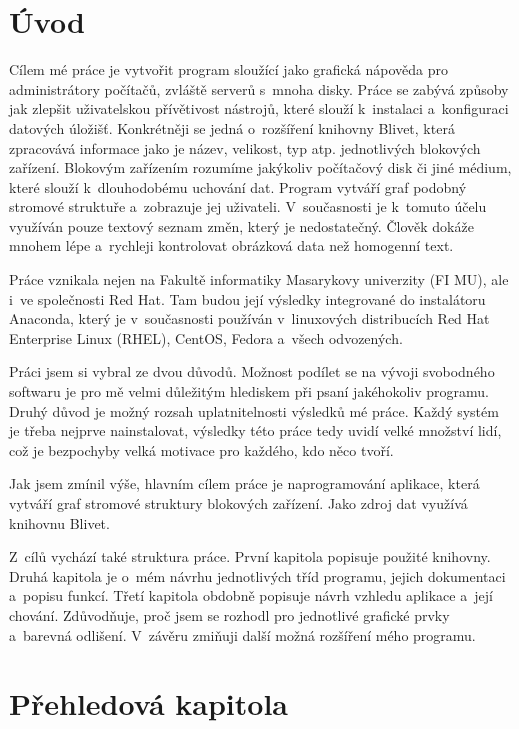 \documentclass[printed,color,table,oneside,nolot,nolof]{fithesis}
\begin{document}
\chapter{Úvod}
	Cílem mé  práce je vytvořit program sloužící jako grafická nápověda pro administrátory počítačů, zvláště serverů s~mnoha disky. Práce se zabývá 
	způsoby jak zlepšit uživatelskou přívětivost nástrojů, které slouží k~instalaci a~konfiguraci datových úložišť.
	Konkrétněji se jedná o~rozšíření knihovny Blivet\cite{blivet}, která zpracovává informace jako je název, velikost, typ atp.
	jednotlivých blokových zařízení. Blokovým zařízením rozumíme jakýkoliv počítačový disk či jiné médium, které slouží k~dlouhodobému uchování dat.
	Program vytváří graf podobný stromové struktuře a~zobrazuje jej uživateli.  V~současnosti je k~tomuto účelu využíván pouze textový 
	seznam změn, který je nedostatečný. Člověk dokáže mnohem lépe a~rychleji kontrolovat obrázková data než homogenní text. 
	
	Práce vznikala nejen na Fakultě informatiky Masarykovy univerzity (FI MU), ale i~ve společnosti Red Hat. Tam budou její výsledky
	integrované do instalátoru Anaconda, který je v~současnosti používán v~linuxových distribucích Red Hat Enterprise Linux (RHEL), CentOS, Fedora a~všech
	odvozených\cite{anaconda-rhel}.

	Práci jsem si vybral ze dvou důvodů.  Možnost podílet se na vývoji svobodného softwaru je pro mě velmi důležitým hlediskem 
	při psaní jakéhokoliv programu. Druhý důvod je možný rozsah uplatnitelnosti výsledků mé práce. Každý systém je třeba nejprve nainstalovat, výsledky
	této práce tedy uvidí velké množství lidí, což je bezpochyby velká motivace pro každého, kdo něco tvoří. 

	Jak jsem zmínil výše, hlavním cílem práce je naprogramování aplikace, která vytváří graf stromové struktury blokových zařízení. Jako zdroj dat
	využívá knihovnu Blivet.  

	Z~cílů vychází také struktura práce. První kapitola popisuje použité knihovny.  
	Druhá kapitola je o~mém návrhu jednotlivých tříd programu, jejich dokumentaci a~popisu funkcí. 
	Třetí kapitola obdobně popisuje návrh vzhledu aplikace a~její chování. Zdůvodňuje, proč jsem se rozhodl pro jednotlivé grafické prvky a~barevná odlišení.
	V~závěru zmiňuji další možná rozšíření mého programu. 

\chapter{Přehledová kapitola}
\end{document}
